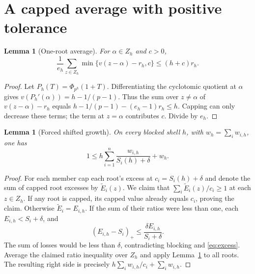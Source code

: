 \documentclass[11pt]{article}
\newtheorem{lemma}[theorem]{Lemma}
\theoremstyle{remark}\newtheorem{remark}[theorem]{Remark}
\newcommand{\pos}[1]{\left(#1\right)_+}
\begin{document}
\section{A capped average with positive tolerance}
\begin{lemma}[One-root average]\label{lem:average}
For $\alpha\in Z_h$ and $c>0$,
\[
 \frac1{e_h}\sum_{z\in Z_h}\min\{v(z-\alpha)-r_h,c\}
 \le (h+c)r_h.
\]
\end{lemma}
\begin{proof}
Let $P_h(T)=\Phi_{p^h}(1+T)$. Differentiating the cyclotomic quotient at $\alpha$ gives
$v(P_h'(\alpha))=h-1/(p-1)$. Thus the sum over $z\ne\alpha$ of
$v(z-\alpha)-r_h$ equals
$h-1/(p-1)-(e_h-1)r_h\le h$. Capping can only decrease these terms; the term at
$z=\alpha$ contributes $c$. Divide by $e_h$.
\end{proof}

\begin{lemma}[Forced shifted growth]\label{lem:forced}
On every blocked shell $h$, with $w_h=\sum_i w_{i,h}$, one has
\begin{equation}\label{eq:forced}
 1\le h\sum_{i=1}^n\frac{w_{i,h}}{S_i(h)+\delta}+w_h.
\end{equation}
\end{lemma}
\begin{proof}
For each member cap each root's excess at $c_i=S_i(h)+\delta$ and denote the sum
of capped root excesses by $\widetilde E_i(z)$. We claim that
$\sum_i\widetilde E_i(z)/c_i\ge1$ at each $z\in Z_h$.
If any root is capped, its capped value already equals $c_i$, proving the claim.
Otherwise $\widetilde E_i=E_{i,h}$. If the sum of their ratios were less than one,
each $E_{i,h}<S_i+\delta$, and
\[
 \pos{E_{i,h}-S_i}\le
   \frac{\delta E_{i,h}}{S_i+\delta}.
\]
The sum of losses would be less than $\delta$, contradicting blocking and
\eqref{eq:excess}. Average the claimed ratio inequality over $Z_h$ and apply
Lemma~\ref{lem:average} to all roots. The resulting right side is precisely
$h\sum_i w_{i,h}/c_i+\sum_i w_{i,h}$.
\end{proof}
\end{document}

